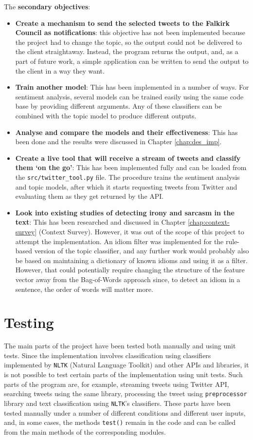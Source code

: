 The \textbf{secondary objectives}:
\begin{itemize}
    \item \textbf{Create a mechanism to send the selected tweets to the Falkirk Council as notifications}: this objective has not been implemented because the project had to change the topic, so the output could not be delivered to the client straightaway. Instead, the program returns the output, and, as a part of future work, a simple application can be written to send the output to the client in a way they want.
    \item \textbf{Train another model}: This has been implemented in a number of ways. For sentiment analysis, several models can be trained easily using the same code base by providing different arguments. Any of these classifiers can be combined with the topic model to produce different outputs. 
    \item \textbf{Analyse and compare the models and their effectiveness}: This has been done and the results were discussed in Chapter \ref{chap:des_imp}.
    \item \textbf{Create a live tool that will receive a stream of tweets and classify them `on the go'}: This has been implemented fully and can be loaded from the \texttt{src/twitter\_tool.py} file. The procedure trains the sentiment analysis and topic models, after which it starts requesting tweets from Twitter and evaluating them as they get returned by the API.
    \item \textbf{Look into existing studies of detecting irony and sarcasm in the text}: This has been researched and discussed in Chapter \ref{chap:context-survey} (Context Survey). However, it was out of the scope of this project to attempt the implementation. An idiom filter was implemented for the rule-based version of the topic classifier, and any further work would probably also be based on maintaining a dictionary of known idioms and using it as a filter. However, that could potentially require changing the structure of the feature vector away from the Bag-of-Words approach since, to detect an idiom in a sentence, the order of words will matter more.  
\end{itemize}

\section{Testing}
\label{sec:testing}

The main parts of the project have been tested both manually and using unit tests. 
Since the implementation involves classification using classifiers implemented by \texttt{NLTK} (Natural Language Toolkit) and other APIs and libraries, it is not possible to test certain parts of the implementation using unit tests. Such parts of the program are, for example, streaming tweets using Twitter API, searching tweets using the same library, processing the tweet using \texttt{preprocessor} library and text classification using \texttt{NLTK}'s classifiers. These parts have been tested manually under a number of different conditions and different user inputs, and, in some cases, the methods \texttt{test()} remain in the code and can be called from the main methods of the corresponding modules.

